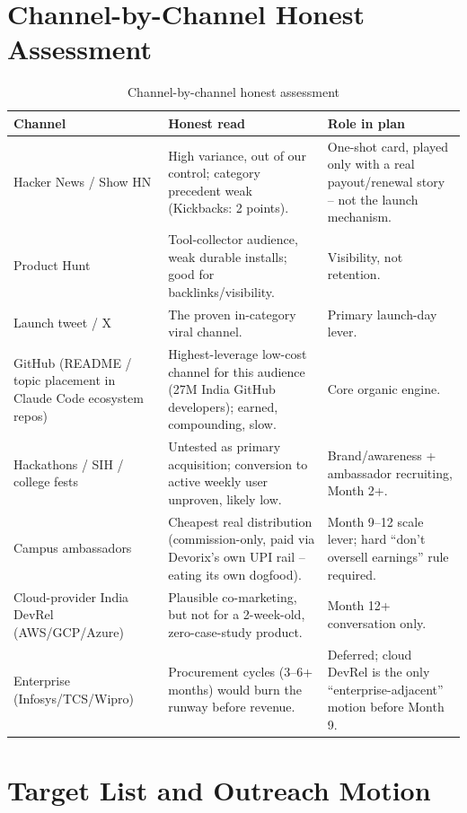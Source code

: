 \section{Channel-by-Channel Honest Assessment}
\label{sec:gtm-channels}

\begin{table}[htbp]
\centering
\caption{Channel-by-channel honest assessment}
\label{tab:gtm-channel-assessment}
\begin{tabular}{@{}p{3.4cm}p{5.6cm}p{5.0cm}@{}}
\toprule
\textbf{Channel} & \textbf{Honest read} & \textbf{Role in plan} \\
\midrule
Hacker News / Show HN & High variance, out of our control; category precedent weak (Kickbacks: 2 points). & One-shot card, played only with a real payout/renewal story -- not the launch mechanism. \\
Product Hunt & Tool-collector audience, weak durable installs; good for backlinks/visibility. & Visibility, not retention. \\
Launch tweet / X & The proven in-category viral channel. & Primary launch-day lever. \\
GitHub (README / topic placement in Claude Code ecosystem repos) & Highest-leverage low-cost channel for this audience (27M India GitHub developers); earned, compounding, slow. & Core organic engine. \\
Hackathons / SIH / college fests & Untested as primary acquisition; conversion to active weekly user unproven, likely low. & Brand/awareness + ambassador recruiting, Month 2+. \\
Campus ambassadors & Cheapest real distribution (commission-only, paid via Devorix's own UPI rail -- eating its own dogfood). & Month 9--12 scale lever; hard ``don't oversell earnings'' rule required. \\
Cloud-provider India DevRel (AWS/GCP/Azure) & Plausible co-marketing, but not for a 2-week-old, zero-case-study product. & Month 12+ conversation only. \\
Enterprise (Infosys/TCS/Wipro) & Procurement cycles (3--6+ months) would burn the runway before revenue. & Deferred; cloud DevRel is the only ``enterprise-adjacent'' motion before Month 9. \\
\bottomrule
\end{tabular}
\end{table}

\section{Target List and Outreach Motion}
\label{sec:gtm-target-list}

